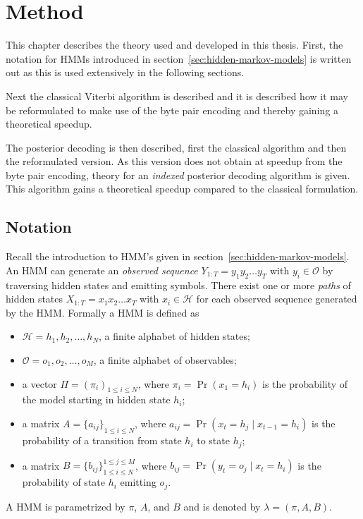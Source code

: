 \chapter{Method}
\label{cha:method}

This chapter describes the theory used and developed in this thesis. First, the
notation for HMMs introduced in section~\ref{sec:hidden-markov-models} is
written out as this is used extensively in the following sections.

Next the classical Viterbi algorithm is described and it is described how it
may be reformulated to make use of the byte pair encoding and thereby gaining a
theoretical speedup.

The posterior decoding is then described, first the classical algorithm and
then the reformulated version. As this version does not obtain at speedup from
the byte pair encoding, theory for an \emph{indexed} posterior decoding
algorithm is given. This algorithm gains a theoretical speedup compared to the
classical formulation.

\section{Notation}

Recall the introduction to HMM's given in
section~\ref{sec:hidden-markov-models}. An HMM can generate an \emph{observed
  sequence} $Y_{1:T} = y_1y_2\dots{}y_T$ with $y_i \in \mathcal{O}$ by
traversing hidden states and emitting symbols. There exist one or more
\emph{paths} of hidden states $X_{1:T} = x_1x_2\dots{}x_T$ with
$x_i \in \mathcal{H}$ for each observed sequence generated by the HMM. Formally
a HMM is defined as
\begin{itemize}
\item $\mathcal{H} = {h_1, h_2, \dots, h_N}$, a finite alphabet of hidden
  states;
\item $\mathcal{O} = {o_1, o_2, \dots, o_M}$, a finite alphabet of observables;
\item a vector $\Pi = {(\pi_i)}_{1 \le i \le N}$, where $\pi_i = \Pr(x_1 =
  h_i)$ is the probability of the model starting in hidden state $h_i$;
\item a matrix $A = {\{a_{ij}\}}_{1 \le i \le N}$, where $a_{ij} = \Pr(x_t
  = h_j \mid x_{t - 1} = h_i)$ is the probability of a transition from state
  $h_i$ to state $h_j$;
\item a matrix $B = {\{b_{ij}\}}_{1 \le i \le N}^{1 \le j \le M}$, where
  $b_{ij} = \Pr(y_t = o_j \mid x_t = h_i)$ is the probability of state
  $h_i$ emitting $o_j$.
\end{itemize}
A HMM is parametrized by $\pi$, $A$, and $B$ and is denoted by $\lambda =
(\pi, A, B)$.

